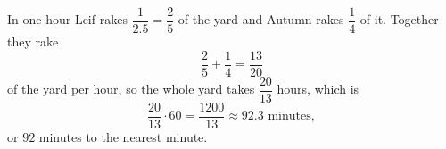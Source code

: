 In one hour Leif rakes $\dfrac{1}{2.5}=\dfrac25$ of the yard and Autumn rakes $\dfrac14$ of it. Together they rake
\[\dfrac25+\dfrac14=\dfrac{13}{20}\]
of the yard per hour, so the whole yard takes $\dfrac{20}{13}$ hours, which is
\[\dfrac{20}{13}\cdot60=\dfrac{1200}{13}\approx92.3\text{ minutes},\]
or $\boxed{92}$ minutes to the nearest minute.
